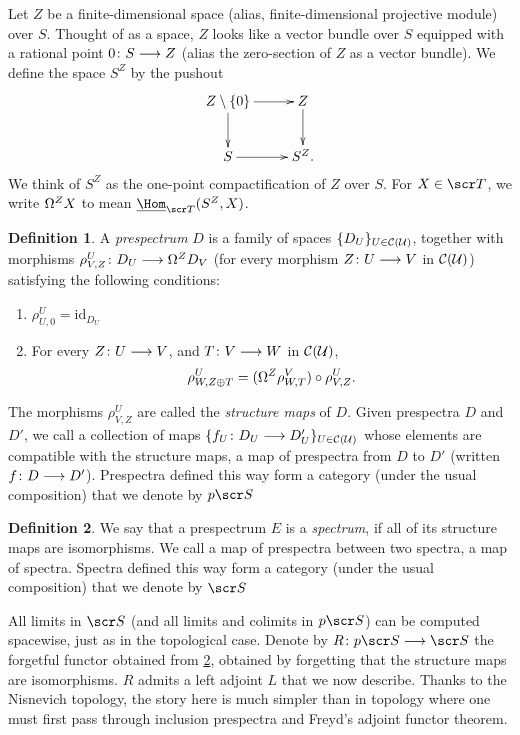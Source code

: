 \documentclass{amsart}
\theoremstyle{definition}
\newtheorem{defn}{Definition}[section]
\begin{document}
Let $Z$ be a finite-dimensional space (alias, finite-dimensional projective module) over $S$. Thought of as a space, $Z$ looks like a vector bundle over $S$ equipped with a rational point $0 \colon S \longrightarrow Z$ (alias the zero-section of $Z$ as a vector bundle). We define the space $S^Z$ by the pushout \[\xymatrix{
Z \setminus \{0\} \ar[r] \ar[d] & Z \ar[d]\\
S \ar[r] & S^Z.
}\]
\noindent We think of $S^Z$ as the one-point compactification of $Z$ over $S$. For $X \in \sT$, we write $\Omega^Z X$ to mean $\underline{\Hom}_{\sT} (S^Z, X)$. 

\begin{defn}
A \emph{prespectrum} $D$ is a family of spaces $\{D_U\}_{U \in {\mathcal{C}}({\mathcal{U}})}$, together with morphisms $\rho^{U}_{V,Z} \colon D_U \longrightarrow \Omega^ZD_V$ (for every morphism $Z \colon U \longrightarrow V$ in ${\mathcal{C}}({\mathcal{U}})$) satisfying the following conditions:
\begin{enumerate}[label=\alph*)]
\item $\rho^{U}_{U,0} = \mathrm{id}_{D_U}$
\item For every $Z \colon U \longrightarrow V$, and $T \colon V \longrightarrow W$ in ${\mathcal{C}}({\mathcal{U}})$, \[\rho^U_{W, Z \oplus T} = (\Omega^Z \rho^{V}_{W,T}) \circ \rho^{U}_{V, Z}.\]
\end{enumerate}
\noindent The morphisms $\rho^{U}_{V,Z}$ are called the \emph{structure maps} of $D$. Given prespectra $D$ and $D'$, we call a collection of maps $\{f_U \colon D_U \longrightarrow D'_U\}_{U \in {\mathcal{C}}({\mathcal{U}})}$ whose elements are compatible with the structure maps, a map of prespectra from $D$ to $D'$ (written $f \colon D \longrightarrow D'$). Prespectra defined this way form a category (under the usual composition) that we denote by $p\sS$
\end{defn}

\begin{defn}\label{defn:spectra}
We say that a prespectrum $E$ is a \emph{spectrum}, if all of its structure maps are isomorphisms. We call a map of prespectra between two spectra, a map of spectra. Spectra defined this way form a category (under the usual composition) that we denote by $\sS$
\end{defn}

\noindent All limits in $\sS$ (and all limits and colimits in $p\sS$) can be computed spacewise, just as in the topological case. Denote by $R \colon p\sS \rtarr \sS$ the forgetful functor obtained from \ref{defn:spectra}, obtained by forgetting that the structure maps are isomorphisms. $R$ admits a left adjoint $L$ that we now describe. Thanks to the Nisnevich topology, the story here is much simpler than in topology where one must first pass through inclusion prespectra and Freyd's adjoint functor theorem.
\end{document}
